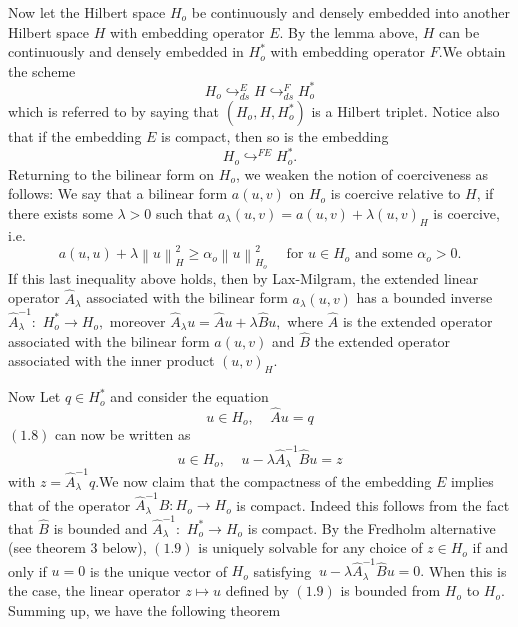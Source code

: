 \documentclass{article}
\begin{document}
Now let the Hilbert space $H_{o}$ be continuously and densely embedded into
another Hilbert space $H$ with embedding operator $E.$ By the lemma above, $%
H $ can be continuously and densely embedded in $H_{o}^{\ast }$ with
embedding operator $F.$We obtain the scheme 
\begin{equation*}
H_{o}\hookrightarrow _{ds}^{E}H\hookrightarrow _{ds}^{F}H_{o}^{\ast }
\end{equation*}%
which is referred to by saying that $\left( H_{o},H,H_{o}^{\ast }\right) $
is a Hilbert triplet. Notice also that if the embedding $E$ is compact, then
so is the embedding%
\begin{equation*}
H_{o}\hookrightarrow ^{FE}H_{o}^{\ast }.
\end{equation*}%
Returning to the bilinear form on $H_{o}$, we weaken the notion of
coerciveness as follows: We say that a bilinear form $a(u,v)$ on $H_{o}$ is
coercive relative to $H$, if there exists some $\lambda >0$ such that $%
a_{\lambda }(u,v)=a(u,v)+\lambda \left( u,v\right) _{H}$ is coercive, i.e.%
\begin{equation*}
a(u,u)+\lambda \left\| u\right\| _{H}^{2}\geq \alpha _{o}\left\| u\right\|
_{H_{o}}^{2}\ \ \ \ \ \ \text{for }u\in H_{o}\text{ and some }\alpha _{o}>0.
\end{equation*}%
If this last inequality above holds, then by Lax-Milgram, the extended
linear operator $\hat{A}_{\lambda }$ associated with the bilinear form $%
a_{\lambda }(u,v)$ has a bounded inverse $\hat{A}_{\lambda }^{-1}:$ $%
H_{o}^{\ast }\rightarrow H_{o},$ moreover $\hat{A}_{\lambda }u=\hat{A}%
u+\lambda \hat{B}u,$ where $\hat{A}$ is the extended operator associated
with the bilinear form $a(u,v)$ and $\hat{B}$ the extended operator
associated with the inner product $\left( u,v\right) _{H}.$

Now Let $q\in H_{o}^{\ast }$ and consider the equation%
\begin{equation}
u\in H_{o},\ \ \ \ \ \hat{A}u=q
\end{equation}%
$\left( 1.8\right) $ can now be written as 
\begin{equation}
u\in H_{o},\ \ \ \ \ u-\lambda \hat{A}_{\lambda }^{-1}\hat{B}u=z
\end{equation}%
with $z=\hat{A}_{\lambda }^{-1}q.$We now claim that the compactness of the
embedding $E$ implies that of the operator $\hat{A}_{\lambda }^{-1}\hat{B}%
:H_{o}\rightarrow H_{o}$ is compact. Indeed this follows from the fact that $%
\hat{B}$ is bounded and $\hat{A}_{\lambda }^{-1}:$ $H_{o}^{\ast }\rightarrow
H_{o}$ is compact. By the Fredholm alternative (see theorem 3 below), $%
\left( 1.9\right) $ is uniquely solvable for any choice of $z\in H_{o}$ if
and only if $u=0$ is the unique vector of $H_{o}$ satisfying $\ u-\lambda 
\hat{A}_{\lambda }^{-1}\hat{B}u=0.$ When this is the case, the linear
operator $z\longmapsto u$ defined by $\left( 1.9\right) $ is bounded from $%
H_{o}$ to $H_{o}$. Summing up, we have the following theorem
\end{document}
